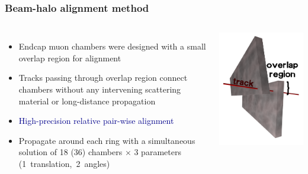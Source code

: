 \documentclass[compress]{beamer}
\begin{document}
\begin{frame}
\frametitle{Beam-halo alignment method}

\vspace{-0.15 cm}
\begin{columns}
\vspace{0.3 cm}
\begin{itemize}
\item Endcap muon chambers were designed with a small overlap region for alignment
\item Tracks passing through overlap region connect chambers without
  any intervening scattering material or long-distance propagation
\item \textcolor{darkblue}{High-precision relative pair-wise alignment}
\item Propagate around each ring with a simultaneous solution of 18 (36) chambers $\times$ 3 parameters \mbox{(1 translation, 2 angles)\hspace{-5 cm}}
\end{itemize}

\includegraphics[width=\linewidth]{overlaps.png}
\end{columns}


\end{frame}
\end{document}
